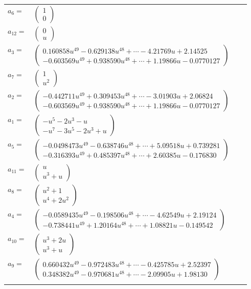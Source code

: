 \documentclass[1p]{elsarticle_modified}
\theoremstyle{definition}
\begin{document}
\begin{tabular}{m{7pt} m{180pt} m{7pt} m{180pt} }
\flushright $a_{6}=$&$\begin{pmatrix}1\\0\end{pmatrix}$ \\
\flushright $a_{12}=$&$\begin{pmatrix}0\\u\end{pmatrix}$ \\
\flushright $a_{3}=$&$\begin{pmatrix}0.160858 u^{49}-0.629138 u^{48}+\cdots-4.21769 u+2.14525\\-0.603569 u^{49}+0.938590 u^{48}+\cdots+1.19866 u-0.0770127\end{pmatrix}$ \\
\flushright $a_{7}=$&$\begin{pmatrix}1\\u^2\end{pmatrix}$ \\
\flushright $a_{2}=$&$\begin{pmatrix}-0.442711 u^{49}+0.309453 u^{48}+\cdots-3.01903 u+2.06824\\-0.603569 u^{49}+0.938590 u^{48}+\cdots+1.19866 u-0.0770127\end{pmatrix}$ \\
\flushright $a_{1}=$&$\begin{pmatrix}- u^5-2 u^3- u\\- u^7-3 u^5-2 u^3+u\end{pmatrix}$ \\
\flushright $a_{5}=$&$\begin{pmatrix}-0.0498473 u^{49}-0.638746 u^{48}+\cdots+5.09518 u+0.739281\\-0.316393 u^{49}+0.485397 u^{48}+\cdots+2.60385 u-0.176830\end{pmatrix}$ \\
\flushright $a_{11}=$&$\begin{pmatrix}u\\u^3+u\end{pmatrix}$ \\
\flushright $a_{8}=$&$\begin{pmatrix}u^2+1\\u^4+2 u^2\end{pmatrix}$ \\
\flushright $a_{4}=$&$\begin{pmatrix}-0.0589435 u^{49}-0.198506 u^{48}+\cdots-4.62549 u+2.19124\\-0.738441 u^{49}+1.20164 u^{48}+\cdots+1.08821 u-0.149542\end{pmatrix}$ \\
\flushright $a_{10}=$&$\begin{pmatrix}u^3+2 u\\u^3+u\end{pmatrix}$ \\
\flushright $a_{9}=$&$\begin{pmatrix}0.660432 u^{49}-0.972483 u^{48}+\cdots-0.425785 u+2.52397\\0.348382 u^{49}-0.970681 u^{48}+\cdots-2.09905 u+1.98130\end{pmatrix}$\\&\end{tabular}
\end{document}

